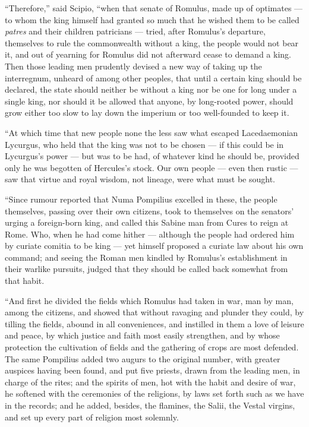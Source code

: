  ``Therefore,'' said Scipio, ``when that senate of Romulus, made up of optimates --- to whom the king himself had granted so much that he wished them to be called \textit{patres} and their children patricians --- tried, after Romulus's departure, themselves to rule the commonwealth without a king, the people would not bear it, and out of yearning for Romulus did not afterward cease to demand a king. Then those leading men prudently devised a new way of taking up the interregnum, unheard of among other peoples, that until a certain king should be declared, the state should neither be without a king nor be one for long under a single king, nor should it be allowed that anyone, by long-rooted power, should grow either too slow to lay down the imperium or too well-founded to keep it.

 ``At which time that new people none the less saw what escaped Lacedaemonian Lycurgus, who held that the king was not to be chosen --- if this could be in Lycurgus's power --- but was to be had, of whatever kind he should be, provided only he was begotten of Hercules's stock. Our own people --- even then rustic --- saw that virtue and royal wisdom, not lineage, were what must be sought.

 ``Since rumour reported that Numa Pompilius excelled in these, the people themselves, passing over their own citizens, took to themselves on the senators' urging a foreign-born king, and called this Sabine man from Cures to reign at Rome. Who, when he had come hither --- although the people had ordered him by curiate comitia to be king --- yet himself proposed a curiate law about his own command; and seeing the Roman men kindled by Romulus's establishment in their warlike pursuits, judged that they should be called back somewhat from that habit.

 ``And first he divided the fields which Romulus had taken in war, man by man, among the citizens, and showed that without ravaging and plunder they could, by tilling the fields, abound in all conveniences, and instilled in them a love of leisure and peace, by which justice and faith most easily strengthen, and by whose protection the cultivation of fields and the gathering of crops are most defended. The same Pompilius added two augurs to the original number, with greater auspices having been found, and put five priests, drawn from the leading men, in charge of the rites; and the spirits of men, hot with the habit and desire of war, he softened with the ceremonies of the religions, by laws set forth such as we have in the records; and he added, besides, the flamines, the Salii, the Vestal virgins, and set up every part of religion most solemnly.

